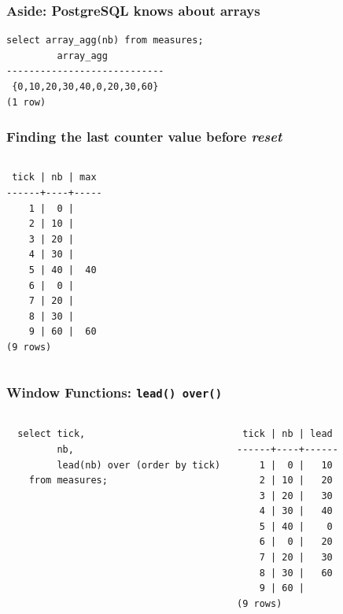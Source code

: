\documentclass{beamer}
\begin{document}
\begin{frame}[fragile]
  \frametitle{Aside: PostgreSQL knows about arrays}

\begin{verbatim}
select array_agg(nb) from measures;
         array_agg          
----------------------------
 {0,10,20,30,40,0,20,30,60}
(1 row)
\end{verbatim}
\end{frame}

\begin{frame}[fragile]
  \frametitle{Finding the last counter value before \textit{reset}}

\begin{columns}
\begin{verbatim}
 tick | nb | max 
------+----+-----
    1 |  0 |    
    2 | 10 |    
    3 | 20 |    
    4 | 30 |    
    5 | 40 |  40
    6 |  0 |    
    7 | 20 |    
    8 | 30 |    
    9 | 60 |  60
(9 rows)
\end{verbatim}
\end{columns}
\end{frame}

\begin{frame}[fragile]
  \frametitle{Window Functions: \texttt{lead() over()}}

\begin{columns}
\begin{verbatim}
  select tick,
         nb,
         lead(nb) over (order by tick)
    from measures;
\end{verbatim}

\begin{verbatim}
 tick | nb | lead 
------+----+------
    1 |  0 |   10
    2 | 10 |   20
    3 | 20 |   30
    4 | 30 |   40
    5 | 40 |    0
    6 |  0 |   20
    7 | 20 |   30
    8 | 30 |   60
    9 | 60 |     
(9 rows)
\end{verbatim}
\end{columns}
\end{frame}
\end{document}
